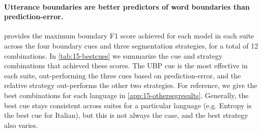 

\paragraph{Utterance boundaries are better predictors of word boundaries than prediction-error.}
 provides the maximum boundary F1 score achieved for each model in each suite across the four boundary cues and three segmentation strategies, for a total of 12 combinations. In \cref{tab:15-bestcues} we summarize the cue and strategy combinations that achieved these scores. The UBP cue is the most effective in each suite, out-performing the three cues based on prediction-error, and the relative strategy out-performs the other two strategies. For reference, we give the best combinations for each language in \cref{app:15-othersegresults}. Generally, the best cue stays consistent across suites for a particular language (e.g. Entropy is the best cue for Italian), but this is not always the case, and the best strategy also varies. %

